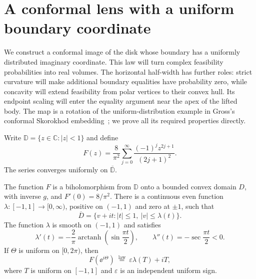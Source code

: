 \section{A conformal lens with a uniform boundary coordinate}\label{sec:lens}

We construct a conformal image of the disk whose boundary has a uniformly distributed imaginary coordinate. This law will turn complex feasibility probabilities into real volumes. The horizontal half-width has further roles: strict curvature will make additional boundary equalities have probability zero, while concavity will extend feasibility from polar vertices to their convex hull. Its endpoint scaling will enter the equality argument near the apex of the lifted body. The map is a rotation of the uniform-distribution example in Gross's conformal Skorokhod embedding~\cite[Section~3.2]{Gross}; we prove all its required properties directly.

Write $\mathbb{D}=\{z\in\mathbb{C}:|z|<1\}$ and define
\begin{equation}\label{eq:lens-map}
 F(z)=\frac8{\pi^2}\sum_{j=0}^{\infty}
             \frac{(-1)^jz^{2j+1}}{(2j+1)^2}.
\end{equation}
The series converges uniformly on $\overline{\mathbb{D}}$.

\begin{lemma}\label{lem:planar-lens}
The function $F$ is a biholomorphism from $\mathbb{D}$ onto a bounded convex domain $D$, with inverse $g$, and $F'(0)=8/\pi^2$. There is a continuous even function $\lambda:[-1,1]\to[0,\infty)$, positive on $(-1,1)$ and zero at $\pm1$, such that
\begin{equation}\label{eq:lens-domain}
 \overline D=\{v+it:|t|\leq1,\ |v|\leq\lambda(t)\}.
\end{equation}
The function $\lambda$ is smooth on $(-1,1)$ and satisfies
\begin{equation}\label{eq:lens-width-curvature}
 \lambda'(t)=-\frac2\pi
       \operatorname{arctanh}\!\left(\sin\frac{\pi t}{2}\right),
 \qquad
 \lambda''(t)=-\sec\frac{\pi t}{2}<0.
\end{equation}
If $\Theta$ is uniform on $[0,2\pi)$, then
\begin{equation}\label{eq:lens-boundary-law}
 F(\ee^{i\Theta})\ \stackrel{\mathrm{law}}{=}\
 \varepsilon\lambda(T)+iT,
\end{equation}
where $T$ is uniform on $[-1,1]$ and $\varepsilon$ is an independent uniform sign.
\end{lemma}

